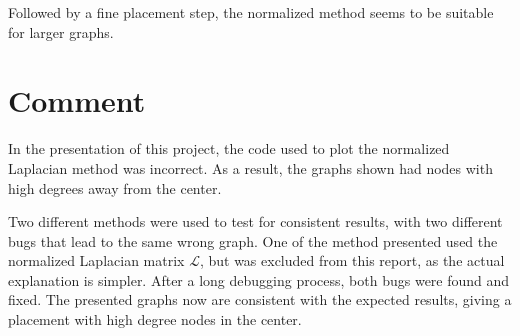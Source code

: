 \documentclass[a4paper,twocolumn]{article}
\begin{document}
Followed by a fine placement step, the normalized method seems to be suitable 
for larger graphs.




\newpage
\appendix

\section{Comment}

In the presentation of this project, the code used to plot the normalized 
Laplacian method was incorrect. As a result, the graphs shown had nodes with 
high degrees away from the center.

Two different methods were used to test for consistent results, with two 
different bugs that lead to the same wrong graph.  One of the method presented 
used the normalized Laplacian matrix $\mathcal L$, but was excluded from this 
report, as the actual explanation is simpler. After a long debugging process, 
both bugs were found and fixed. The presented graphs now are consistent with the 
expected results, giving a placement with high degree nodes in the center.
\end{document}
